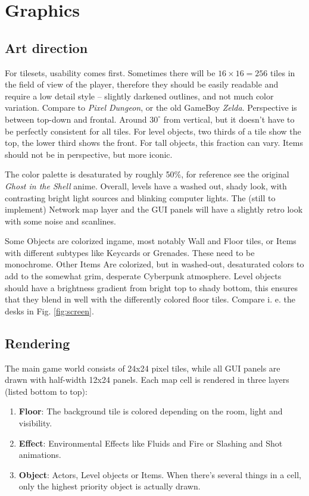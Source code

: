 \documentclass[11pt,a4paper, twocolumn]{article}
\begin{document}
\section{Graphics}\label{sec:art}

\subsection{Art direction}

For tilesets, usability comes first. Sometimes there will be $16\times 16 = 256$
tiles in the field of view of the player, therefore they should be easily
readable and require a low detail style -- slightly darkened outlines, and not much color
variation. Compare to \emph{Pixel Dungeon}, or the old GameBoy \emph{Zelda}.
Perspective is between
top-down and frontal. Around $30^{\circ}$ from vertical, but it doesn't have to be
perfectly consistent for all tiles. For level objects, two thirds of a tile show
the top, the lower third shows the front. For tall objects, this fraction can vary.
Items should not be in perspective, but more iconic.

The color palette is desaturated by roughly 50\%, for reference see the original
\emph{Ghost in the Shell} anime. Overall, levels have a washed out, shady look, with
contrasting bright light sources and blinking computer lights.
The (still to implement) Network map layer and the GUI panels will have a slightly
retro look with some noise and scanlines.

Some Objects are colorized ingame, most notably Wall and Floor tiles, or Items with
different subtypes like Keycards or Grenades. These need to be monochrome. Other Items
Are colorized, but in washed-out, desaturated colors to add to the somewhat grim,
desperate Cyberpunk atmosphere. Level objects should have a brightness gradient from
bright top to shady bottom, this ensures that they blend in well with the differently
colored floor tiles. Compare i. e. the desks in Fig. \ref{fig:screen}.

\subsection{Rendering}

The main game world consists of 24x24 pixel tiles, while all GUI panels are drawn with
half-width 12x24 panels. Each map cell is rendered in three layers (listed bottom to top):

\begin{enumerate}
    \item \textbf{Floor}: The background tile is colored depending
        on the room, light and visibility.
    \item \textbf{Effect}: Environmental Effects like Fluids and Fire
        or Slashing and Shot animations.
    \item \textbf{Object}: Actors, Level objects or Items. When there's
        several things in a cell, only the highest priority object is
        actually drawn.
\end{enumerate}
\end{document}
